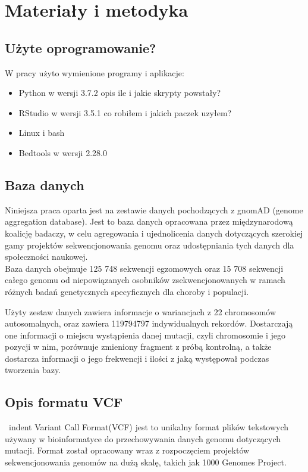\documentclass[12pt]{article}
\begin{document}
\section{Materiały i metodyka}

\subsection{Użyte oprogramowanie?}\indent
W pracy użyto wymienione programy i aplikacje:
\begin{itemize}
    \item Python w wersji 3.7.2
    opis ile i jakie skrypty powstały?
    \item RStudio w wersji 3.5.1
    co robiłem i jakich paczek uzyłem?
    \item Linux i bash
    \item Bedtools w wersji 2.28.0

\end{itemize}
\subsection{Baza danych}

\indent Niniejsza praca oparta jest na zestawie danych pochodzących z gnomAD (genome aggregation database). Jest to baza danych opracowana przez międzynarodową koalicję badaczy, w celu agregowania i ujednolicenia danych dotyczących szerokiej gamy projektów sekwencjonowania genomu oraz udostępniania tych danych dla społeczności naukowej. \\

Baza danych obejmuje 125 748 sekwencji egzomowych oraz 15 708 sekwencji całego genomu od niepowiązanych osobników zsekwencjonowanych w ramach różnych badań genetycznych specyficznych dla choroby i populacji.

\indent
Użyty zestaw danych zawiera informacje o wariancjach z 22 chromosomów autosomalnych, oraz zawiera 119794797 indywidualnych rekordów. Dostarczają one informacji o miejscu wystąpienia danej mutacji, czyli chromosomie i jego pozycji w nim, porównuje zmieniony fragment z próbą kontrolną, a także dostarcza informacji o jego frekwencji i ilości z jaką występował podczas tworzenia bazy. 

\subsection{Opis formatu VCF}\
indent Variant Call Format(VCF) jest to unikalny format plików tekstowych używany w bioinformatyce do przechowywania danych genomu dotyczących mutacji. Format został opracowany wraz z rozpoczęciem projektów sekwencjonowania genomów na dużą skalę, takich jak 1000 Genomes Project. 
\end{document}
